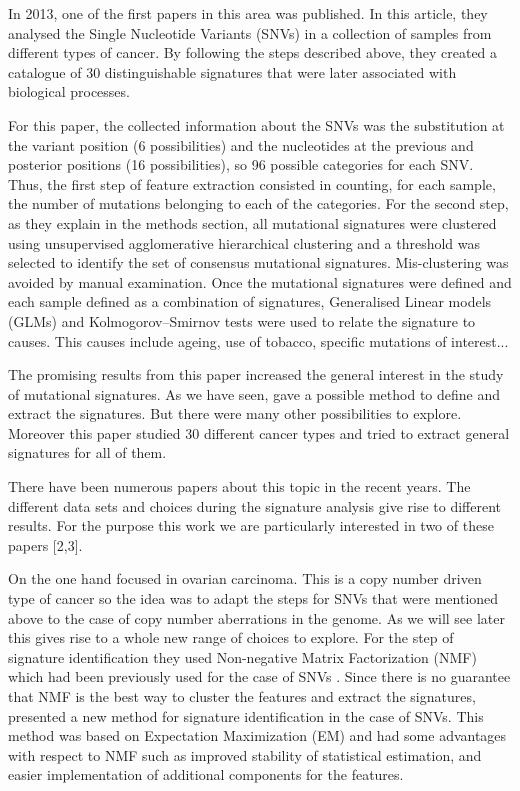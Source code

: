 \documentclass[a4paper]{article}
\begin{document}
In 2013, one of the first papers in this area  \cite{Alex} was published. In this article, they analysed the Single Nucleotide Variants (SNVs) in a collection of samples from different types of cancer. By following the steps described above, they created a catalogue of 30 distinguishable signatures that were later associated with biological processes. 

For this paper, the collected information about the SNVs was the substitution at the variant position (6 possibilities) and the nucleotides at the previous and posterior positions (16 possibilities), so 96 possible categories for each SNV. Thus, the first step of feature extraction consisted in counting, for each sample, the number of mutations belonging to each of the categories. For the second step, as they explain in the methods section, all mutational signatures were clustered using unsupervised agglomerative hierarchical clustering and a threshold was selected to identify the set of consensus mutational signatures. Mis-clustering was avoided by manual examination. Once the mutational signatures were defined and each sample defined as a combination of signatures, Generalised Linear models (GLMs) and Kolmogorov–Smirnov tests were used to relate the signature to causes. This causes include ageing, use of tobacco, specific mutations of interest... 

The promising results from this paper increased the general interest in the study of mutational signatures. As we have seen,  \cite{Alex} gave a possible method to define and extract the signatures. But there were many other possibilities to explore. Moreover this paper studied 30 different cancer types and tried to extract general signatures for all of them. 

There have been numerous papers about this topic in the recent years. The different data sets and choices during the signature analysis give rise to different results. For the purpose this work we are particularly interested in two of these papers [2,3]. 

On the one hand  \cite{Geoff} focused in ovarian carcinoma. This is a copy number driven type of cancer so the idea was to adapt the steps for SNVs that were mentioned above to the case of copy number aberrations in the genome. As we will see later this gives rise to a whole new range of choices to explore. For the step of signature identification they used Non-negative Matrix Factorization (NMF) which had been previously used for the case of SNVs  \cite{Alex}. Since there is no guarantee that NMF is the best way to cluster the features and extract the signatures,  \cite{Shira} presented a new method for signature identification in the case of SNVs. This method was based on Expectation Maximization (EM) and had some advantages with respect to NMF such as improved stability of statistical estimation, and easier implementation of additional components for the features. 
\end{document}
